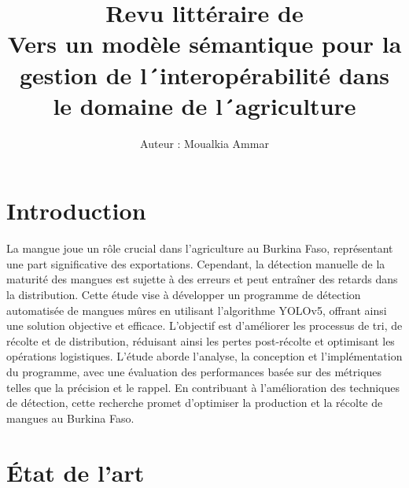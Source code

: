 \documentclass{article}
\title{Revu littéraire de \\ Vers un modèle sémantique pour la gestion de l´interopérabilité dans le domaine de l´agriculture}
\author{Auteur : Moualkia Ammar}
\begin{document}
	\maketitle
	
	\tableofcontents
	\newpage
	
	\section{Introduction}
	La mangue joue un rôle crucial dans l'agriculture au Burkina Faso, représentant une part significative des exportations. Cependant, la détection manuelle de la maturité des mangues est sujette à des erreurs et peut entraîner des retards dans la distribution. Cette étude vise à développer un programme de détection automatisée de mangues mûres en utilisant l'algorithme YOLOv5, offrant ainsi une solution objective et efficace. L'objectif est d'améliorer les processus de tri, de récolte et de distribution, réduisant ainsi les pertes post-récolte et optimisant les opérations logistiques. L'étude aborde l'analyse, la conception et l'implémentation du programme, avec une évaluation des performances basée sur des métriques telles que la précision et le rappel. En contribuant à l'amélioration des techniques de détection, cette recherche promet d'optimiser la production et la récolte de mangues au Burkina Faso.
	
	
	\section{État de l'art}
	
	
\end{document}
